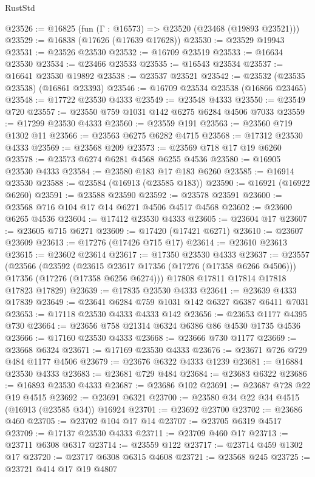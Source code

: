 \begin{lexlean}{RustStd}
\begin{coremodule}
@23526 := @16825 (fun (Γ : @16573) => @23520 (@23468 (@19893 @23521)))
@23529 := @16838 (@17626 (@17639 @17628))
@23530 := @23529 @19943
@23531 := @23526 @23530
@23532 := @16709 @23519
@23533 := @16634 @23530
@23534 := @23466 @23533
@23535 := @16543 @23534
@23537 := @16641 @23530 @19892
@23538 := @23537 @23521
@23542 := @23532 (@23535 @23538) (@16861 @23393)
@23546 := @16709 @23534 @23538 (@16866 @23465)
@23548 := @17722 @23530 @4333
@23549 := @23548 @4333
@23550 := @23549 @720
@23557 := @23550 @759 @1031 @142 @6275 @6284 @4506 @7033
@23559 := @17299 @23530 @4333
@23560 := @23559 @191
@23563 := @23560 @719 @1302 @11
@23566 := @23563 @6275 @6282 @4715
@23568 := @17312 @23530 @4333
@23569 := @23568 @209
@23573 := @23569 @718 @17 @19 @6260
@23578 := @23573 @6274 @6281 @4568 @6255 @4536
@23580 := @16905 @23530 @4333
@23584 := @23580 @183 @17 @183 @6260
@23585 := @16914 @23530
@23588 := @23584 (@16913 (@23585 @183))
@23590 := @16921 (@16922 @6260)
@23591 := @23588 @23590
@23592 := @23578 @23591
@23600 := @23568 @716 @104 @17 @14 @6271 @4506 @4517 @4568
@23602 := @23600 @6265 @4536
@23604 := @17412 @23530 @4333
@23605 := @23604 @17
@23607 := @23605 @715 @6271
@23609 := @17420 (@17421 @6271)
@23610 := @23607 @23609
@23613 := @17276 (@17426 @715 @17)
@23614 := @23610 @23613
@23615 := @23602 @23614
@23617 := @17350 @23530 @4333
@23637 := @23557
    (@23566
      (@23592
        (@23615 @23617 @17356 (@17276 (@17358 @6266 @4506)))
        @17356
        (@17276 (@17358 @6256 @6274)))
      @17808
      @17811
      @17814
      @17818
      @17823
      @17829)
@23639 := @17835 @23530 @4333
@23641 := @23639 @4333 @17839
@23649 := @23641 @6284 @759 @1031 @142 @6327 @6387 @6411 @7031
@23653 := @17118 @23530 @4333 @4333 @142
@23656 := @23653 @1177 @4395 @730
@23664 := @23656 @758 @21314 @6324 @6386 @86 @4530 @1735 @4536
@23666 := @17160 @23530 @4333
@23668 := @23666 @730 @1177
@23669 := @23668 @6324
@23671 := @17169 @23530 @4333
@23676 := @23671 @726 @729 @484 @1177 @4506
@23679 := @23676 @6322 @4333 @1239
@23681 := @16884 @23530 @4333
@23683 := @23681 @729 @484
@23684 := @23683 @6322
@23686 := @16893 @23530 @4333
@23687 := @23686 @102
@23691 := @23687 @728 @22 @19 @4515
@23692 := @23691 @6321
@23700 := @23580 @34 @22 @34 @4515 (@16913 (@23585 @34)) @16924
@23701 := @23692 @23700
@23702 := @23686 @460
@23705 := @23702 @104 @17 @14
@23707 := @23705 @6319 @4517
@23709 := @17137 @23530 @4333
@23711 := @23709 @460 @17
@23713 := @23711 @6308 @6317
@23714 := @23559 @122
@23717 := @23714 @459 @1302 @17
@23720 := @23717 @6308 @6315 @4608
@23721 := @23568 @245
@23725 := @23721 @414 @17 @19 @4807

\end{coremodule}
\end{lexlean}
